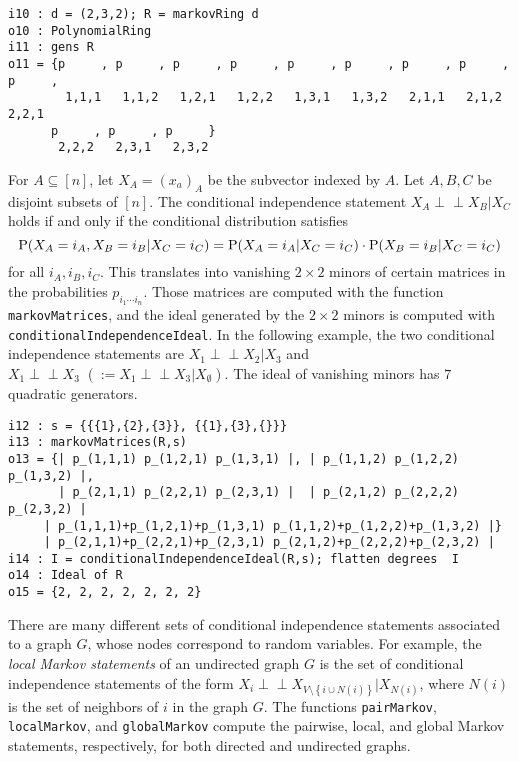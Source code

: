 \documentclass[letterpaper]{article}
\theoremstyle{plain}
\theoremstyle{definition}
\def\ci{\perp\!\!\!\perp}
\begin{document}
\begin{verbatim}
i10 : d = (2,3,2); R = markovRing d
o10 : PolynomialRing
i11 : gens R
o11 = {p     , p     , p     , p     , p     , p     , p     , p     , p     ,
        1,1,1   1,1,2   1,2,1   1,2,2   1,3,1   1,3,2   2,1,1   2,1,2   2,2,1 
      p     , p     , p     }
       2,2,2   2,3,1   2,3,2
\end{verbatim}

For $A \subseteq [n]$, let $X_{A} = (x_{a})_{A}$ be the subvector
indexed by $A$.  Let $A,B,C$ be disjoint subsets of $[n]$.  
The conditional independence statement
$X_{A} \ci X_{B} | X_{C}$ holds if and only if the conditional
distribution satisfies
$$
{\rm P}(X_{A} = i_{A}, X_{B} = i_{B} | X_{C} = i_{C}) =
{\rm P}(X_{A} = i_{A} | X_{C} = i_{C})\cdot {\rm P}( X_{B} = i_{B} | X_{C} = i_{C})$$
for all $i_{A}, i_{B}, i_{C}$.   This translates into vanishing
$2\!\times\! 2$ minors of certain matrices in the probabilities 
$p_{i_{1}\cdots i_{n}}$.  Those matrices are computed with the 
function {\tt markovMatrices},
and the ideal generated by the $2 \!\times\! 2$ minors is computed with 
{\tt conditionalIndependenceIdeal}.  In the following example,
the two conditional independence statements are $X_{1} \ci X_{2} | X_{3}$
and $X_{1} \ci X_{3} \, \,  (:=  X_{1} \ci X_{3} | X_{\emptyset})$. 
The ideal of vanishing minors has $7$ quadratic generators. 

\begin{verbatim}
i12 : s = {{{1},{2},{3}}, {{1},{3},{}}}
i13 : markovMatrices(R,s)
o13 = {| p_(1,1,1) p_(1,2,1) p_(1,3,1) |, | p_(1,1,2) p_(1,2,2) p_(1,3,2) |, 
       | p_(2,1,1) p_(2,2,1) p_(2,3,1) |  | p_(2,1,2) p_(2,2,2) p_(2,3,2) |  
     | p_(1,1,1)+p_(1,2,1)+p_(1,3,1) p_(1,1,2)+p_(1,2,2)+p_(1,3,2) |}
     | p_(2,1,1)+p_(2,2,1)+p_(2,3,1) p_(2,1,2)+p_(2,2,2)+p_(2,3,2) |
i14 : I = conditionalIndependenceIdeal(R,s); flatten degrees  I 
o14 : Ideal of R
o15 = {2, 2, 2, 2, 2, 2, 2}
\end{verbatim}

There are many different sets of conditional independence statements
associated to a graph $G$, whose nodes correspond to random variables.
For example, the \emph{local Markov statements} of an undirected graph $G$
is the set of conditional independence statements of the form
$X_{i} \ci X_{V \setminus \left\{i \cup N(i)\right\}} | X_{N(i)}$, where $N(i)$ is the set of neighbors of $i$ in the graph $G$.
The functions {\tt pairMarkov}, {\tt localMarkov}, and {\tt globalMarkov}
compute the pairwise, local, and global Markov statements, respectively, 
for both directed and undirected graphs.
\end{document}
